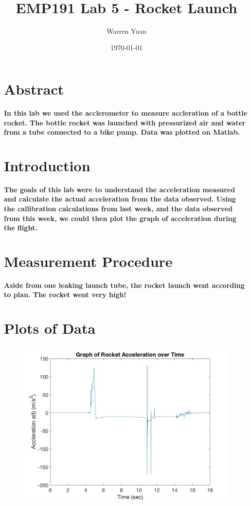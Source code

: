 \documentclass[a4paper,11pt]{article}
\title{\vspace{-2.0cm}EMP191 Lab 5 - Rocket Launch}
\author{Warren Yuan}
\date{\today}
\begin{document}
\maketitle

\section{Abstract}
\paragraph{\quad In this lab we used the acclerometer to measure accleration of a bottle rocket. The bottle rocket was launched with pressurized air and water from a tube connected to a bike pump. Data was plotted on Matlab. }

\section{Introduction}
\paragraph{\quad The goals of this lab were to understand the acceleration measured and calculate the actual acceleration from the data observed. Using the callibration calculations from last week, and the data observed from this week, we could then plot the graph of acceleration during the flight. }

\section{Measurement Procedure}
\paragraph{\quad Aside from one leaking launch tube, the rocket launch went according to plan. The rocket went very high!}

\section{Plots of Data}
\begin{figure}[H]
\includegraphics[width=\linewidth/2]{Rocketa(t).jpg}
\end{figure}
\end{document}
